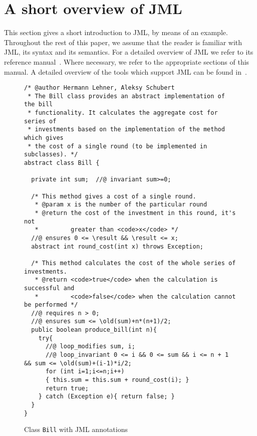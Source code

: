 \section{A short overview of JML}\label{SecJMLOverview}

This section gives a short introduction to JML, by means of an
example. Throughout the rest of this paper, we assume that the
reader is familiar with JML, its syntax and its semantics. For a
detailed overview of JML we refer to its reference
manual~\cite{JMLReferenceManual05}. Where necessary, we refer to the
appropriate sections of this manual. A detailed overview of the tools
which support JML can be found in~\cite{BurdyCCEKLLP05}.


\begin{figure}[th!]
{\small
\begin{verbatim}
/* @author Hermann Lehner, Aleksy Schubert
 * The Bill class provides an abstract implementation of the bill 
 * functionality. It calculates the aggregate cost for series of
 * investments based on the implementation of the method which gives 
 * the cost of a single round (to be implemented in subclasses). */
abstract class Bill {

  private int sum;  //@ invariant sum>=0;
 
  /* This method gives a cost of a single round.
   * @param x is the number of the particular round
   * @return the cost of the investment in this round, it's not
   *         greater than <code>x</code> */
  //@ ensures 0 <= \result && \result <= x;
  abstract int round_cost(int x) throws Exception;
  
  /* This method calculates the cost of the whole series of investments.
   * @return <code>true</code> when the calculation is successful and
   *         <code>false</code> when the calculation cannot be performed */
  //@ requires n > 0;
  //@ ensures sum <= \old(sum)+n*(n+1)/2;
  public boolean produce_bill(int n){
    try{
      //@ loop_modifies sum, i;
      //@ loop_invariant 0 <= i && 0 <= sum && i <= n + 1 && sum <= \old(sum)+(i-1)*i/2;
      for (int i=1;i<=n;i++) 
      { this.sum = this.sum + round_cost(i); }
      return true;
    } catch (Exception e){ return false; }
  }
}
\end{verbatim}
}
\caption{Class \texttt{Bill} with JML annotations} 
\label{FigJMLSpec}
\end{figure}

